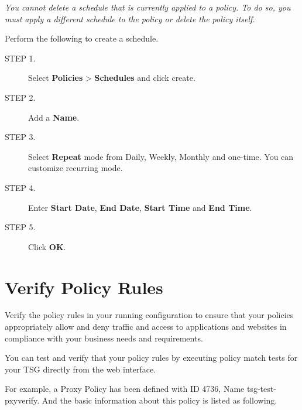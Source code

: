 \notemark\textit{You cannot delete a schedule that is currently applied to a policy. To do so, you must apply a different schedule to the policy or delete the policy itself.}


Perform the following to create a schedule.


\begin{description}
    \item[STEP 1.]	Select \textbf{Policies} > \textbf{Schedules} and click create.
    \item[STEP 2.]	Add a \textbf{Name}.
    \item[STEP 3.]	Select \textbf{Repeat} mode from Daily, Weekly, Monthly and one-time. You can customize recurring mode.
    \item[STEP 4.]	Enter \textbf{Start Date}, \textbf{End Date}, \textbf{Start Time} and \textbf{End Time}.
    \item[STEP 5.]	Click \textbf{OK}. 
\end{description}    

\section*{\hypertarget{link:Verify Policy Rules}{Verify Policy Rules}}
\label{sec:policies:verify}

Verify the policy rules in your running configuration to ensure that your policies appropriately allow and deny traffic and access to applications and websites in compliance with your business needs and requirements. 


You can test and verify that your policy rules by executing policy match tests for your TSG directly from the web interface.


For example, a Proxy Policy has been defined with ID 4736, Name tsg-test-pxyverify. And the basic information about this policy is listed as following.


